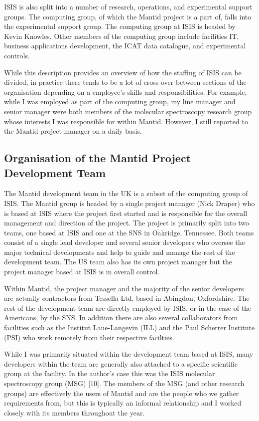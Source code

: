 \documentclass[paper=a4, fontsize=11pt]{scrartcl}	%
\numberwithin{equation}{section}															%
\numberwithin{figure}{section}																%
\numberwithin{table}{section}
\begin{document}
ISIS is also split into a number of research, operations, and
experimental support groups. The computing group, of which the Mantid
project is a part of, falls into the experimental support group. The
computing group at ISIS is headed by Kevin Knowles. Other members of the
computing group include facilities IT, business applications
development, the ICAT data catalogue, and experimental controls.

While this description provides an overview of how the staffing of ISIS
can be divided, in practice there tends to be a lot of cross over
between sections of the organisation depending on a employee's skills
and responsibilities. For example, while I was employed as part of the
computing group, my line manager and senior manager were both
members of the molecular spectroscopy research group whose interests I
was responsible for within Mantid. However, I still reported to the
Mantid project manager on a daily basis.

\subsection{Organisation of the Mantid Project Development
Team}\label{organisation-of-the-mantid-project-development-team}

The Mantid development team in the UK is a subset of the computing group
of ISIS. The Mantid group is headed by a single project manager (Nick
Draper) who is based at ISIS where the project first started and is
responsible for the overall management and direction of the project. The
project is primarily split into two teams, one based at ISIS and one at the SNS in
Oakridge, Tennessee. Both teams consist of a single lead developer and
several senior developers who oversee the major technical developments
and help to guide and manage the rest of the development team. The US
team also has its own project manager but the project manager based at
ISIS is in overall control.

Within Mantid, the project manager and the majority of the senior
developers are actually contractors from Tessella Ltd. based in
Abingdon, Oxfordshire. The rest of the development team are directly
employed by ISIS, or in the case of the Americans, by the SNS. In
addition there are also several collaborators from facilities such as
the Institut Laue-Langevin (ILL) and the Paul Scherrer Institute (PSI)
who work remotely from their respective facilties.

While I was primarily situated within the development team based at
ISIS, many developers within the team are generally also attached to a
specific scientific group at the facility. In the author's case this was
the ISIS molecular spectroscopy group (MSG) {[}10{]}. The members of the
MSG (and other research groups) are effectively the users of Mantid and
are the people who we gather requirements from, but this is
typically an informal relationship and I worked closely with its
members throughout the year.
\end{document}
